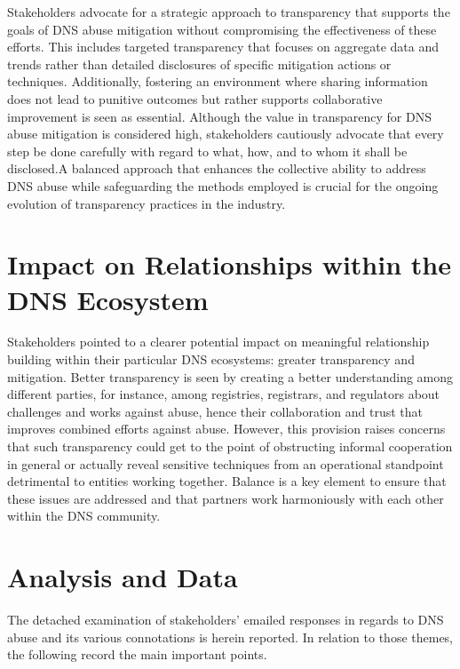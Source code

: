 Stakeholders advocate for a strategic approach to transparency that supports the goals of DNS abuse mitigation without compromising the effectiveness of these efforts. This includes targeted transparency that focuses on aggregate data and trends rather than detailed disclosures of specific mitigation actions or techniques. Additionally, fostering an environment where sharing information does not lead to punitive outcomes but rather supports collaborative improvement is seen as essential. Although the value in transparency for DNS abuse mitigation is considered high, stakeholders cautiously advocate that every step be done carefully with regard to what, how, and to whom it shall be disclosed.A balanced approach that enhances the collective ability to address DNS abuse while safeguarding the methods employed is crucial for the ongoing evolution of transparency practices in the industry.


\section{Impact on Relationships within the DNS Ecosystem} 

 Stakeholders pointed to a clearer potential impact on meaningful relationship building within their particular DNS ecosystems: greater transparency and mitigation. Better transparency is seen by creating a better understanding among different parties, for instance, among registries, registrars, and regulators about challenges and works against abuse, hence their collaboration and trust that improves combined efforts against abuse. However, this provision raises concerns that such transparency could get to the point of obstructing informal cooperation in general or actually reveal sensitive techniques from an operational standpoint detrimental to entities working together. Balance is a key element to ensure that these issues are addressed and that partners work harmoniously with each other within the DNS community.

\section{Analysis and Data } 

The detached examination of stakeholders' emailed responses in regards to DNS abuse and its various connotations is herein reported. In relation to those themes, the following record the main important points.


